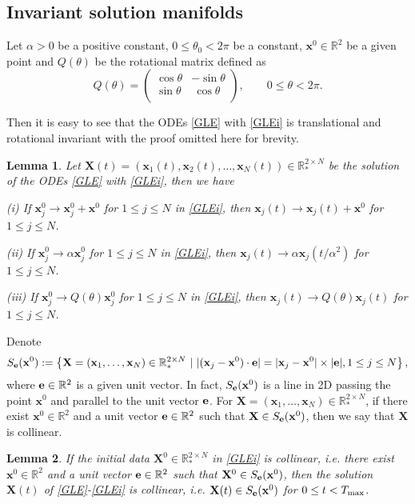 \documentclass{aims}
\theoremstyle{plain}
\newtheorem{lemma}{Lemma}[section]
\theoremstyle{definition}
\newcommand{\bx}{{\mathbf x}}
\newcommand{\bX}{{\mathbf X}}
\newcommand{\nn}{\nonumber}
\newcommand{\be} {\begin{equation}}
\newcommand{\ee}{\end{equation}}
\begin{document}
\subsection{Invariant solution manifolds}
Let $\alpha>0$ be a positive constant,
$0\le \theta_0<2\pi$ be a constant,
$\bx^0\in{\mathbb R}^2$ be a given point and $Q(\theta)$ be the rotational matrix defined as
\be
Q(\theta)=\left(\begin{array}{ll}
\cos\theta &-\sin\theta\\
\sin\theta &\ \cos\theta\\
\end{array}\right), \qquad 0\le \theta <2\pi.\nn
\ee

Then it is easy to see that the ODEs \eqref{GLE} with \eqref{GLEi}
is translational and rotational invariant with the proof omitted here for brevity.

\begin{lemma}\label{invar12}
Let $\bX(t)=(\bx_1(t),\bx_2(t),\ldots, \bx_N(t))\in {\mathbb R}_*^{2\times N}$
be the solution of the ODEs \eqref{GLE} with \eqref{GLEi}, then we have

(i) If $\bx_j^0\to \bx_j^0+\bx^0$ for $1\le j\le N$ in \eqref{GLEi},
then $\bx_j(t)\to \bx_j(t)+\bx^0$ for $1\le j\le N$.

(ii) If $\bx_j^0\to \alpha\bx_j^0$ for $1\le j\le N$ in \eqref{GLEi},
then $\bx_j(t)\to \alpha\bx_j(t/\alpha^2)$ for $1\le j\le N$.

(iii) If $\bx_j^0\to Q(\theta)\bx_j^0$ for $1\le j\le N$ in \eqref{GLEi},
then $\bx_j(t)\to Q(\theta)\bx_j(t)$ for $1\le j\le N$.
\end{lemma}

Denote
\[S_{{\bf e}}(\bx^0):=\left\{\bX=(\bx_1,\ldots,\bx_N)\in {\mathbb R}_*^{2\times N} \ |\ |(\bx_j-\bx^0)\cdot{\bf e}|=|\bx_j-\bx^0|\times |{\bf e}|, 1\le j\le N\right\},\]
where ${\bf e}\in {\mathbb R}^2$ is a given unit vector. In fact, $S_{{\bf e}}(\bx^0)$ is a line in 2D passing the point $\bx^0$ and parallel to the unit vector ${\bf e}$. For $\bX=(\bx_1,\ldots,\bx_N)\in {\mathbb R}_*^{2\times N}$, if there exist $\bx^0\in {\mathbb R}^2$ and a unit vector ${\bf e}\in {\mathbb R}^2$ such that $\bX\in S_{{\bf e}}(\bx^0)$, then we say that
$\bX$ is collinear.

\begin{lemma}\label{lmcolin}
If the initial data $\bX^0\in {\mathbb R}_*^{2\times N}$ in \eqref{GLEi} is collinear, i.e.
there exist  $\bx^0\in{\mathbb R}^2$ and a unit vector  ${\bf e}\in {\mathbb R}^2$ such that $\bX^0\in S_{\bf e}(\bx^0)$, then the solution $\bX(t)$ of
\eqref{GLE}-\eqref{GLEi} is collinear, i.e.
$\bX(t)\in S_{\bf e}(\bx^0)$ for $0\le t<T_{\rm max}$.
\end{lemma}
\end{document}
